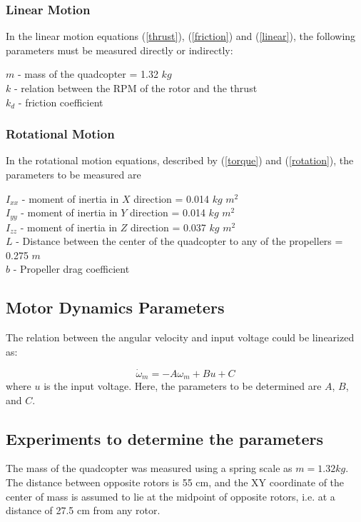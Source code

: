 \documentclass{article}
\begin{document}
\subsubsection{Linear Motion}
In the linear motion equations (\ref{thrust}), (\ref{friction}) and (\ref{linear}), the following parameters must be measured directly or indirectly:

\begin{center}
$m$ - mass of the quadcopter = 1.32 $kg$\\
$k$ - relation between the RPM of the rotor and the thrust\\
$k_d$ - friction coefficient
\end{center}

\subsubsection{Rotational Motion}
 
In the rotational motion equations, described by (\ref{torque}) and (\ref{rotation}), the parameters to be measured are 
\begin{center}
$I_{xx}$ - moment of inertia in $X$ direction = 0.014 $kg$ $m^2$\\
$I_{yy}$ - moment of inertia in $Y$ direction = 0.014 $kg$ $m^2$\\
$I_{zz}$ - moment of inertia in $Z$ direction = 0.037 $kg$ $m^2$\\
$L$ - Distance between the center of the quadcopter to any of the propellers = 0.275 $m$\\
$b$ - Propeller drag coefficient
\end{center}

\subsection{Motor Dynamics Parameters}
The relation between the angular velocity and input voltage could be linearized as:

\begin{equation}
\dot{\omega}_m=-A\omega_m+Bu+C
\end{equation}
where $u$ is the input voltage. 
Here, the parameters to be determined are $A$, $B$, and $C$.


\subsection{Experiments to determine the parameters}
The mass of the quadcopter was measured using a spring scale as $m = 1.32 kg$. The distance between opposite rotors is 55 cm, and the XY coordinate of the center of mass is assumed to lie at the midpoint of opposite rotors, i.e. at a distance of 27.5 cm from any rotor. 
\end{document}
